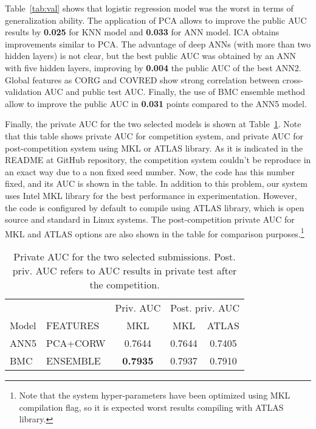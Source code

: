 \documentclass[a4paper,english,twoside]{article}
\begin{document}
Table~\ref{tab:val} shows that logistic regression model was the worst in
terms of generalization ability. The application of PCA allows to
improve the public AUC results by \textbf{0.025} for KNN model and
\textbf{0.033} for ANN model. ICA obtains improvements similar to PCA.
The advantage of deep ANNs (with more than two hidden layers) is not
clear, but the best public AUC was obtained by an ANN with five hidden
layers, improving by \textbf{0.004} the public AUC of the best ANN2.
Global features as CORG and COVRED show strong correlation between
cross-validation AUC and public test AUC. Finally, the use of BMC
ensemble method allow to improve the public AUC in \textbf{0.031} points
compared to the ANN5 model.

Finally, the private AUC for the two selected models is shown at
Table~\ref{tab:private}. Note that this table shows private AUC for competition
system, and private AUC for post-competition system using MKL or ATLAS
library. As it is indicated in the README at GitHub repository, the competition
system couldn't be reproduce in an exact way due to a non fixed seed number.
Now, the code has this number fixed, and its AUC is shown in the table. In
addition to this problem, our system uses Intel MKL library for the best performance
in experimentation. However, the code is configured by default to compile using
ATLAS library, which is open source and standard in Linux systems. The
post-competition private AUC for MKL and ATLAS options are also shown in the
table for comparison purposes.\footnote{Note that the system hyper-parameters
  have been optimized using MKL compilation flag, so it is expected worst
  results compiling with ATLAS library.}

\begin{table}
  \centering
  \begin{tabular}{|l|l|c||c|c|}
    \hline
          &          & Priv. AUC & \multicolumn{2}{|c|}{Post. priv. AUC}\\
    Model & FEATURES & MKL & \multicolumn{1}{|c}{MKL} & \multicolumn{1}{c|}{ATLAS} \\
    \hline
    \hline
    ANN5 & PCA+CORW & 0.7644          & 0.7644 & 0.7405\\
    BMC & ENSEMBLE & \textbf{0.7935}  & 0.7937 & 0.7910\\
    \hline
  \end{tabular}
  \caption{Private AUC for the two selected submissions. Post. priv. AUC refers
    to AUC results in private test after the competition.\label{tab:private}}
\end{table}
\end{document}
